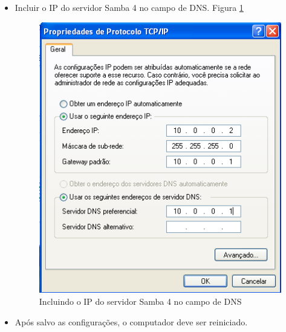 \begin{itemize}
	\pagebreak
	
	\item Incluir o IP do servidor Samba 4 no campo de DNS. Figura \ref{propriedades_tcpip}
	\begin{figure}[ht]
			\centering
	 		\includegraphics[width=0.7 \textwidth]{figuras/propriedades_tcpip}
			\caption{Incluindo o IP do servidor Samba 4 no campo de DNS}
			\label{propriedades_tcpip}
	\end{figure}
	
	\item Após salvo as configurações, o computador deve ser reiniciado.
	
\end{itemize}